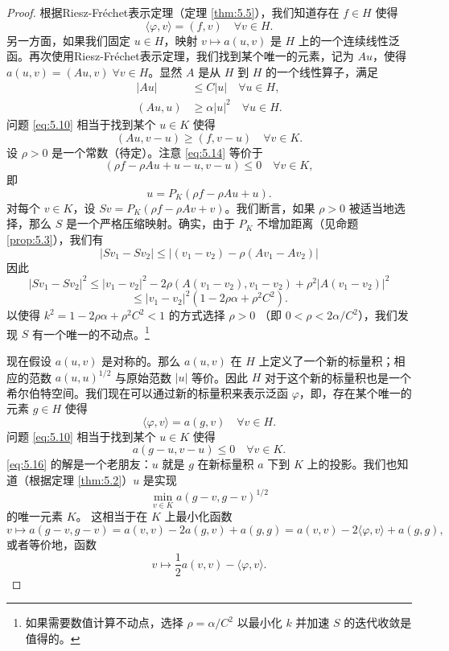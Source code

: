 \begin{proof}
根据Riesz-Fréchet表示定理（定理 \ref{thm:5.5}），我们知道存在 $f \in H$ 使得
\[ \langle \varphi, v \rangle = (f,v) \quad \forall v \in H. \]
另一方面，如果我们固定 $u \in H$，映射 $v \mapsto a(u,v)$ 是 $H$ 上的一个连续线性泛函。再次使用Riesz-Fréchet表示定理，我们找到某个唯一的元素，记为 $Au$，使得 $a(u,v)=(Au,v) \; \forall v \in H$。显然 $A$ 是从 $H$ 到 $H$ 的一个线性算子，满足
\begin{align}
|Au| &\le C|u| \quad \forall u \in H, \label{eq:5.12} \\
(Au,u) &\ge \alpha|u|^2 \quad \forall u \in H. \label{eq:5.13}
\end{align}
问题 \eqref{eq:5.10} 相当于找到某个 $u \in K$ 使得
\begin{equation}\label{eq:5.14}
(Au, v-u) \ge (f, v-u) \quad \forall v \in K.
\end{equation}
设 $\rho > 0$ 是一个常数（待定）。注意 \eqref{eq:5.14} 等价于
\begin{equation}\label{eq:5.15}
(\rho f - \rho Au + u - u, v-u) \le 0 \quad \forall v \in K,
\end{equation}
即
\[ u = P_K(\rho f - \rho Au + u). \]
对每个 $v \in K$，设 $Sv = P_K(\rho f - \rho Av + v)$。我们断言，如果 $\rho > 0$ 被适当地选择，那么 $S$ 是一个严格压缩映射。确实，由于 $P_K$ 不增加距离（见命题 \ref{prop:5.3}），我们有
\[ |Sv_1 - Sv_2| \le |(v_1 - v_2) - \rho(Av_1 - Av_2)| \]
因此
\[ |Sv_1 - Sv_2|^2 \le |v_1-v_2|^2 - 2\rho(A(v_1-v_2), v_1-v_2) + \rho^2|A(v_1-v_2)|^2 \]
\[ \le |v_1-v_2|^2 (1-2\rho\alpha + \rho^2 C^2). \]
以使得 $k^2 = 1-2\rho\alpha + \rho^2 C^2 < 1$ 的方式选择 $\rho > 0$ （即 $0 < \rho < 2\alpha/C^2$），我们发现 $S$ 有一个唯一的不动点。\footnote{如果需要数值计算不动点，选择 $\rho = \alpha/C^2$ 以最小化 $k$ 并加速 $S$ 的迭代收敛是值得的。}

现在假设 $a(u,v)$ 是对称的。那么 $a(u,v)$ 在 $H$ 上定义了一个新的标量积；相应的范数 $a(u,u)^{1/2}$ 与原始范数 $|u|$ 等价。因此 $H$ 对于这个新的标量积也是一个希尔伯特空间。我们现在可以通过新的标量积来表示泛函 $\varphi$，即，存在某个唯一的元素 $g \in H$ 使得
\[ \langle \varphi, v \rangle = a(g,v) \quad \forall v \in H. \]
问题 \eqref{eq:5.10} 相当于找到某个 $u \in K$ 使得
\begin{equation}\label{eq:5.16}
a(g-u, v-u) \le 0 \quad \forall v \in K.
\end{equation}
\eqref{eq:5.16} 的解是一个老朋友：$u$ 就是 $g$ 在新标量积 $a$ 下到 $K$ 上的投影。我们也知道（根据定理 \ref{thm:5.2}）$u$ 是实现
\[ \min_{v \in K} a(g-v, g-v)^{1/2} \]
的唯一元素 $K$。
这相当于在 $K$ 上最小化函数
\[ v \mapsto a(g-v, g-v) = a(v,v) - 2a(g,v) + a(g,g) = a(v,v) - 2\langle\varphi, v\rangle + a(g,g), \]
或者等价地，函数
\[ v \mapsto \frac{1}{2}a(v,v) - \langle \varphi, v \rangle. \]
\end{proof}

